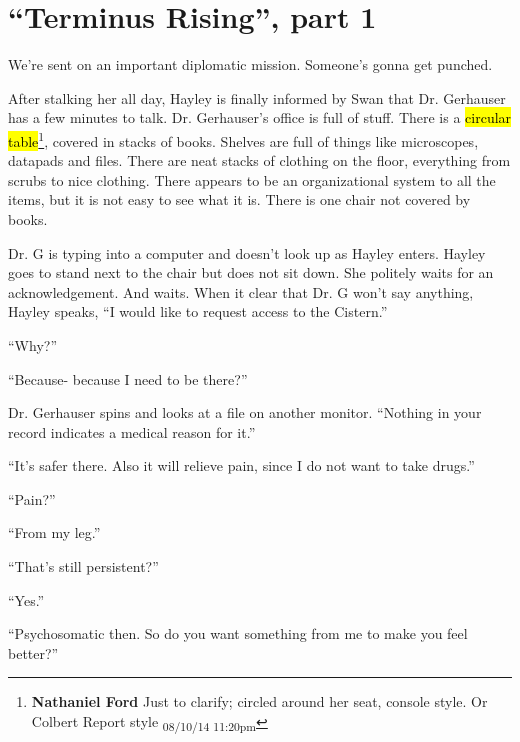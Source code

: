 \setcounter{chapter}{ 26 }
\chapter{\textbf{``Terminus Rising'', part 1} }






We're sent on an important diplomatic mission.  Someone's gonna get punched.



\noindent\hrulefill





After stalking her all day, Hayley is finally informed by Swan that Dr. Gerhauser has a few minutes to talk.  Dr. Gerhauser's office is full of stuff. There is a \hl{circular table}\footnote{\textbf{Nathaniel Ford }Just to clarify; circled around her seat, console style. Or Colbert Report style \textsubscript{08/10/14 11:20pm}}, covered in stacks of books.  Shelves are full of things like microscopes, datapads and files.  There are neat stacks of clothing on the floor, everything from scrubs to nice clothing.  There appears to be an organizational system to all the items, but it is not easy to see what it is.  There is one chair not covered by books.



Dr. G is typing into a computer and doesn't look up as Hayley enters.  Hayley goes to stand next to the chair but does not sit down.  She politely waits for an acknowledgement.  And waits.  When it clear that Dr. G won't say anything, Hayley speaks, ``I would like to request access to the Cistern.''

``Why?''

``Because- because I need to be there?''

Dr. Gerhauser spins and looks at a file on another monitor.  ``Nothing in your record indicates a medical reason for it.''

``It's safer there.  Also it will relieve pain, since I do not want to take drugs.''

``Pain?''

``From my leg.''

``That's still persistent?''

``Yes.''

``Psychosomatic then.  So do you want something from me to make you feel better?''

